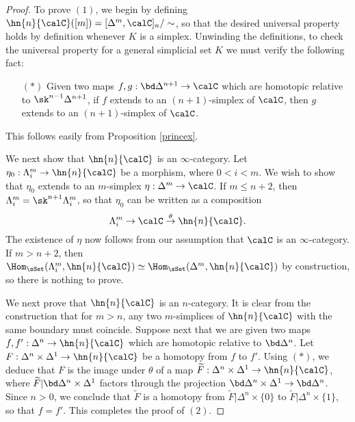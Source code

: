 \begin{proof}
To prove $(1)$, we begin by defining $\hn{n}{\calC}([m]) = [ \Delta^m, \calC ]_{n}/ \sim$, so that the desired universal property holds by definition whenever $K$ is a simplex. Unwinding the definitions, to check the universal property for a general simplicial set $K$ we must verify the following fact:
\begin{itemize}
\item[$(\ast)$] Given two maps $f,g: \bd \Delta^{n+1} \rightarrow \calC$ which are homotopic relative to
$\sk^{n-1} \Delta^{n+1}$, if $f$ extends to an $(n+1)$-simplex of $\calC$, then $g$ extends
to an $(n+1)$-simplex of $\calC$. 
\end{itemize} 
This follows easily from Proposition \ref{princex}.

We next show that $\hn{n}{\calC}$ is an $\infty$-category. Let
$\eta_0: \Lambda^m_i \rightarrow \hn{n}{\calC}$ be a morphism, where $0 < i < m$. We wish to show that $\eta_0$ extends to an $m$-simplex $\eta: \Delta^m \rightarrow \calC$. If $m \leq n+2$, then
$\Lambda^m_i = \sk^{n+1} \Lambda^m_i$, so that $\eta_0$ can be written as a composition
$$ \Lambda^m_i \rightarrow \calC \stackrel{\theta}{\rightarrow} \hn{n}{\calC}.$$
The existence of $\eta$ now follows from our assumption that $\calC$ is an $\infty$-category.
If $m > n+2$, then $\Hom_{\sSet}( \Lambda^m_i, \hn{n}{ \calC}) \simeq \Hom_{\sSet}( \Delta^m, \hn{n}{ \calC})$ by construction, so there is nothing to prove.

We next prove that $\hn{n}{ \calC}$ is an $n$-category. It is clear from the construction that for $m > n$, any two $m$-simplices of $\hn{n}{\calC}$ with the same boundary must coincide. Suppose next that we are given two maps $f,f': \Delta^n \rightarrow \hn{n}{ \calC}$ which are homotopic relative to
$\bd \Delta^n$. Let $F: \Delta^n \times \Delta^1 \rightarrow \hn{n}{\calC}$ be a homotopy from
$f$ to $f'$. Using $(\ast)$, we deduce that $F$ is the image under $\theta$ of a map $\widetilde{F}: \Delta^n \times \Delta^1 \rightarrow \hn{n}{\calC}$, where $\widetilde{F}| \bd \Delta^n \times \Delta^1$ factors through the projection $\bd \Delta^n \times \Delta^1 \rightarrow \bd \Delta^n$. Since $n > 0$, we conclude that $\widetilde{F}$ is a homotopy from $\widetilde{F} | \Delta^n \times \{0\}$ to $\widetilde{F} | \Delta^n \times \{1\}$, so that $f = f'$. This completes the proof of $(2)$.


\end{proof}
